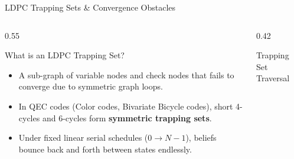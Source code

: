 \begin{frame}{LDPC Trapping Sets \& Convergence Obstacles}
    \begin{columns}[T]
        \begin{column}{0.55\textwidth}
            \begin{block}{What is an LDPC Trapping Set?}
                \begin{itemize}
                    \item A sub-graph of variable nodes and check nodes that fails to converge due to symmetric graph loops.
                    \item In QEC codes (Color codes, Bivariate Bicycle codes), short 4-cycles and 6-cycles form \textbf{symmetric trapping sets}.
                    \item Under fixed linear serial schedules ($0 \rightarrow N-1$), beliefs bounce back and forth between states endlessly.
                \end{itemize}
            \end{block}
        \end{column}
        
        \begin{column}{0.42\textwidth}
            \begin{block}{Trapping Set Traversal}
                \centering
            \end{block}
        \end{column}
    \end{columns}
\end{frame}


